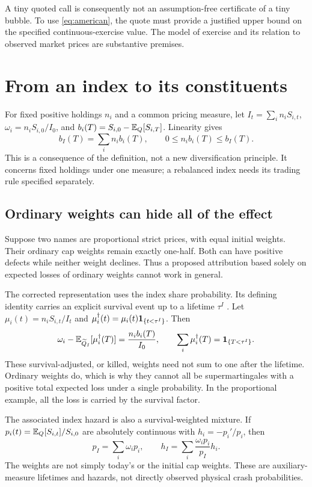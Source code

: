 A tiny quoted call is consequently not an assumption-free certificate
of a tiny bubble. To use \eqref{eq:american}, the quote must provide a
justified upper bound on the specified continuous-exercise value. The
model of exercise and its relation to observed market prices are
substantive premises.

\section{From an index to its constituents}\label{sec:baskets}
For fixed positive holdings $n_i$ and a common pricing measure, let
$I_t=\sum_i n_iS_{i,t}$, $\omega_i=n_iS_{i,0}/I_0$, and
$b_i(T)=S_{i,0}-\mathbb{E}_Q[S_{i,T}]$. Linearity gives
\begin{equation}\label{eq:basketadd}
 b_I(T)=\sum_i n_i b_i(T),\qquad 0\leq n_i b_i(T)\leq b_I(T).
\end{equation}
This is a consequence of the definition, not a new diversification
principle. It concerns fixed holdings under one measure; a rebalanced
index needs its trading rule specified separately.

\subsection{Ordinary weights can hide all of the effect}
Suppose two names are proportional strict prices, with equal initial
weights. Their ordinary cap weights remain exactly one-half. Both can
have positive defects while neither weight declines. Thus a proposed
attribution based solely on expected losses of ordinary weights cannot
work in general.

The corrected representation uses the index share probability. Its
defining identity carries an explicit survival event up to a lifetime
$\tau^I$ \cite{kardaras2015strict}. Let
$\mu_i(t)=n_iS_{i,t}/I_t$ and
$\mu_i^\dagger(t)=\mu_i(t)\mathbf{1}_{\{t<\tau^I\}}$. Then
\begin{equation}\label{eq:killed}
 \omega_i-\mathbb{E}_{\widetilde Q_I}[\mu_i^\dagger(T)]
       =\frac{n_i b_i(T)}{I_0},\qquad
 \sum_i\mu_i^\dagger(T)=\mathbf{1}_{\{T<\tau^I\}}.
\end{equation}
These survival-adjusted, or killed, weights need not sum to one after
the lifetime. Ordinary weights do, which is why they cannot all be
supermartingales with a positive total expected loss under a single
probability. In the proportional example, all the loss is carried by
the survival factor.

The associated index hazard is also a survival-weighted mixture. If
$p_i(t)=\mathbb{E}_Q[S_{i,t}]/S_{i,0}$ are absolutely continuous with
$h_i=-p_i'/p_i$, then
\begin{equation}\label{eq:hazard}
 p_I=\sum_i\omega_i p_i,
 \qquad h_I=\sum_i\frac{\omega_i p_i}{p_I}h_i.
\end{equation}
The weights are not simply today's or the initial cap weights. These
are auxiliary-measure lifetimes and hazards, not directly observed
physical crash probabilities.

